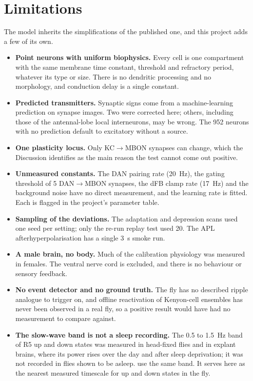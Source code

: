 \documentclass[11pt]{article}
\newcommand{\KCMBON}{KC$\rightarrow$MBON}
\begin{document}
\section{Limitations}
The model inherits the simplifications of the published one, and this project adds a few of its own.
\begin{itemize}\setlength\itemsep{1pt}
  \item \textbf{Point neurons with uniform biophysics.} Every cell is one compartment with the same membrane time constant, threshold and refractory period, whatever its type or size. There is no dendritic processing and no morphology, and conduction delay is a single constant.
  \item \textbf{Predicted transmitters.} Synaptic signs come from a machine-learning prediction on synapse images. Two were corrected here; others, including those of the antennal-lobe local interneurons, may be wrong. The 952 neurons with no prediction default to excitatory without a source.
  \item \textbf{One plasticity locus.} Only \KCMBON{} synapses can change, which the Discussion identifies as the main reason the test cannot come out positive.
  \item \textbf{Unmeasured constants.} The DAN pairing rate (20~Hz), the gating threshold of 5 DAN$\rightarrow$MBON synapses, the dFB clamp rate (17~Hz) and the background noise have no direct measurement, and the learning rate is fitted. Each is flagged in the project's parameter table.
  \item \textbf{Sampling of the deviations.} The adaptation and depression scans used one seed per setting; only the re-run replay test used 20. The APL afterhyperpolarisation has a single 3~s smoke run.
  \item \textbf{A male brain, no body.} Much of the calibration physiology was measured in females. The ventral nerve cord is excluded, and there is no behaviour or sensory feedback.
  \item \textbf{No event detector and no ground truth.} The fly has no described ripple analogue to trigger on, and offline reactivation of Kenyon-cell ensembles has never been observed in a real fly, so a positive result would have had no measurement to compare against.
  \item \textbf{The slow-wave band is not a sleep recording.} The 0.5 to 1.5~Hz band of R5 up and down states \citep{raccuglia2019} was measured in head-fixed flies and in explant brains, where its power rises over the day and after sleep deprivation; it was not recorded in flies shown to be asleep. \citet{raccuglia2025} use the same band. It serves here as the nearest measured timescale for up and down states in the fly.
\end{itemize}
\end{document}
